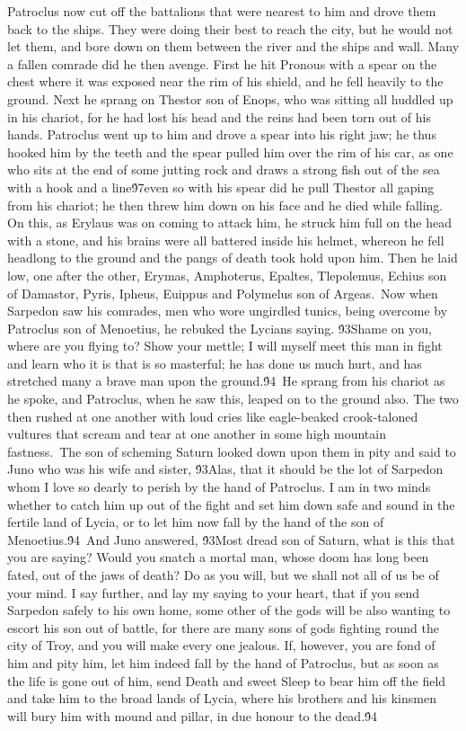 {Patroclus now cut off the battalions that were nearest to him and drove them back to the ships. They were doing their best to reach the city, but he would not let them, and bore down on them between the river and the ships and wall. Many a fallen comrade did he then avenge. First he hit Pronous with a spear on the chest where it was exposed near the rim of his shield, and he fell heavily to the ground. Next he sprang on Thestor son of Enops, who was sitting all huddled up in his chariot, for he had lost his head and the reins had been torn out of his hands. Patroclus went up to him and drove a spear into his right jaw; he thus hooked him by the teeth and the spear pulled him over the rim of his car, as one who sits at the end of some jutting rock and draws a strong fish out of the sea with a hook and a line\'97even so with his spear did he pull Thestor all gaping from his chariot; he then threw him down on his face and he died while falling. On this, as Erylaus was on coming to attack him, he struck him full on the head with a stone, and his brains were all battered inside his helmet, whereon he fell headlong to the ground and the pangs of death took hold upon him. Then he laid low, one after the other, Erymas, Amphoterus, Epaltes, Tlepolemus, Echius son of Damastor, Pyris, Ipheus, Euippus and Polymelus son of Argeas.\
Now when Sarpedon saw his comrades, men who wore ungirdled tunics, being overcome by Patroclus son of Menoetius, he rebuked the Lycians saying. \'93Shame on you, where are you flying to? Show your mettle; I will myself meet this man in fight and learn who it is that is so masterful; he has done us much hurt, and has stretched many a brave man upon the ground.\'94\
He sprang from his chariot as he spoke, and Patroclus, when he saw this, leaped on to the ground also. The two then rushed at one another with loud cries like eagle-beaked crook-taloned vultures that scream and tear at one another in some high mountain fastness.\
The son of scheming Saturn looked down upon them in pity and said to Juno who was his wife and sister, \'93Alas, that it should be the lot of Sarpedon whom I love so dearly to perish by the hand of Patroclus. I am in two minds whether to catch him up out of the fight and set him down safe and sound in the fertile land of Lycia, or to let him now fall by the hand of the son of Menoetius.\'94\
And Juno answered, \'93Most dread son of Saturn, what is this that you are saying? Would you snatch a mortal man, whose doom has long been fated, out of the jaws of death? Do as you will, but we shall not all of us be of your mind. I say further, and lay my saying to your heart, that if you send Sarpedon safely to his own home, some other of the gods will be also wanting to escort his son out of battle, for there are many sons of gods fighting round the city of Troy, and you will make every one jealous. If, however, you are fond of him and pity him, let him indeed fall by the hand of Patroclus, but as soon as the life is gone out of him, send Death and sweet Sleep to bear him off the field and take him to the broad lands of Lycia, where his brothers and his kinsmen will bury him with mound and pillar, in due honour to the dead.\'94\
}
